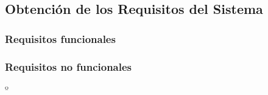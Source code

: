 \subsection{Obtención de los Requisitos del Sistema} \label{sec:6_2-requisitos}

\subsubsection{Requisitos funcionales}













\subsubsection{Requisitos no funcionales}
º